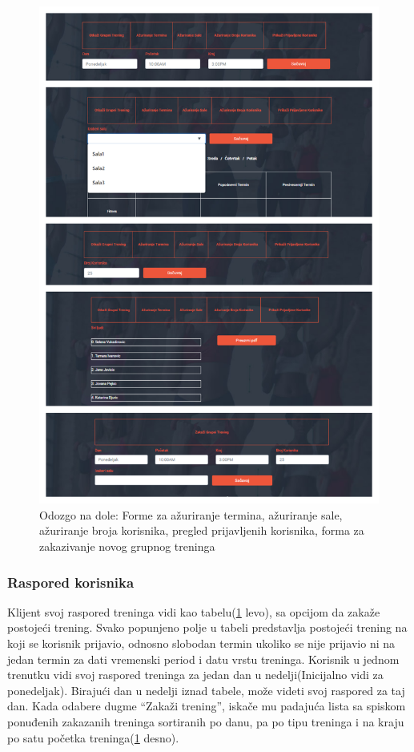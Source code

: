 \documentclass[../main.tex]{subfiles}
\begin{document}
\begin{figure}[!ht]
\begin{center}
\includegraphics[scale=0.35]{sections/korisnicki_interfejs/screenshots/trener_raspored.png}
\end{center}
\caption{ Odozgo na dole: Forme za ažuriranje termina, ažuriranje sale, ažuriranje broja korisnika, pregled prijavljenih korisnika, forma za zakazivanje novog grupnog treninga }
\label{fig:trener_forme}
\end{figure}

\subsubsection{Raspored korisnika}
Klijent svoj raspored treninga vidi kao tabelu(\ref{fig:trener_forme} levo), sa opcijom da zakaže postojeći trening. Svako popunjeno polje u tabeli predstavlja postojeći trening na koji se korisnik prijavio, odnosno slobodan termin ukoliko se nije prijavio ni na jedan termin za dati vremenski period i datu vrstu treninga. Korisnik u jednom trenutku vidi svoj raspored treninga za jedan dan u nedelji(Inicijalno vidi za ponedeljak). Birajući dan u nedelji iznad tabele, može videti svoj raspored za taj dan.
Kada odabere dugme ``Zakaži trening'', iskače mu padajuća lista sa spiskom ponuđenih zakazanih treninga sortiranih po danu, pa po tipu treninga i na kraju po satu početka treninga(\ref{fig:trener_forme} desno).
\end{document}

